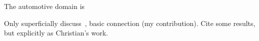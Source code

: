 The automotive domain is 

Only superficially discuss~\cite{menard_date20}, basic connection (my contribution). Cite some results, but explicitly as Christian's work.